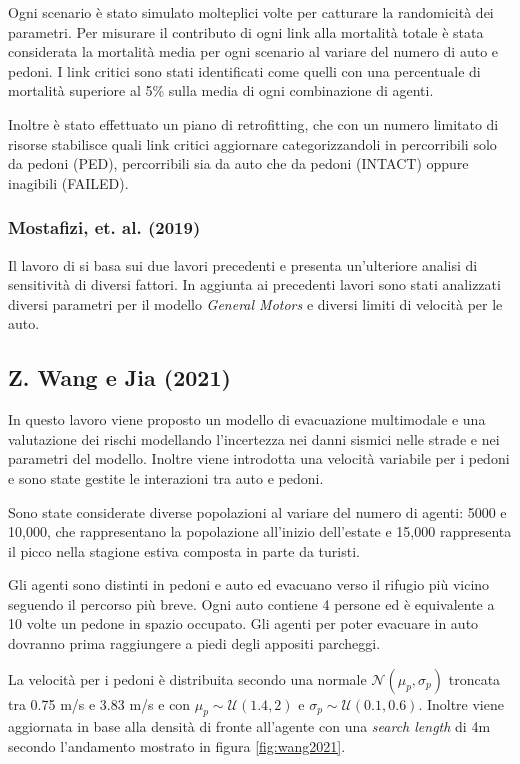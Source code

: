 Ogni scenario è stato simulato molteplici volte per catturare la randomicità dei parametri. 
Per misurare il contributo di ogni link alla mortalità totale è stata considerata la mortalità media per ogni scenario al variare del numero di auto e pedoni.
I link critici sono stati identificati come quelli con una percentuale di mortalità superiore al 5\% sulla media di ogni combinazione di agenti.

Inoltre è stato effettuato un piano di retrofitting, che con un numero limitato di risorse stabilisce quali link critici aggiornare
categorizzandoli in percorribili solo da pedoni (PED), percorribili sia da auto che da pedoni (INTACT) oppure inagibili (FAILED).


\subsubsection*{Mostafizi, et. al. (2019)}
Il lavoro di \textcite{mostafizi2019agent} si basa sui due lavori precedenti e 
presenta un'ulteriore analisi di sensitività di diversi fattori. 
In aggiunta ai precedenti lavori sono stati analizzati diversi parametri per 
il modello \textit{General Motors} e diversi limiti di velocità per le auto.


\subsection{Z. Wang e Jia (2021)}
In questo lavoro viene proposto un modello di evacuazione multimodale e una valutazione dei rischi modellando l'incertezza
nei danni sismici nelle strade e nei parametri del modello. Inoltre viene introdotta una velocità variabile per i pedoni e sono state 
gestite le interazioni tra auto e pedoni.

Sono state considerate diverse popolazioni al variare del numero di agenti: 5000 e 10,000,
che rappresentano la popolazione all'inizio dell'estate e 15,000 rappresenta il picco nella stagione estiva composta in parte da turisti.

Gli agenti sono distinti in pedoni e auto ed evacuano verso il rifugio più vicino seguendo il percorso più breve.
Ogni auto contiene 4 persone ed è equivalente a 10 volte un pedone in spazio occupato.
Gli agenti per poter evacuare in auto dovranno prima raggiungere a piedi degli appositi parcheggi.

La velocità per i pedoni è distribuita secondo una normale $\mathcal{N}(\mu_p,\sigma_p)$ troncata tra 0.75 m/s e 3.83 m/s e
con $\mu_p \sim \mathcal{U}(1.4, 2)$ e $\sigma_p \sim \mathcal{U}(0.1, 0.6)$.
Inoltre viene aggiornata in base alla densità di fronte all'agente con una \textit{search length} di 4m secondo l'andamento mostrato in figura \ref{fig:wang2021}.

